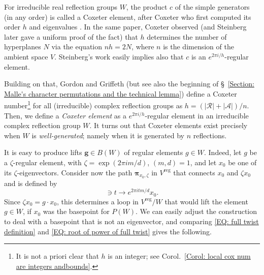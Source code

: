 \documentclass[ALCO, Unicode]{cedram}
\newcommand{\op}[1]{\operatorname{#1}}
\newcommand{\op}[1]{\operatorname{#1}}
\begin{document}
For irreducible real reflection groups $W$, the product $c$ of the simple generators (in any order) is called a Coxeter element, after Coxeter who first computed its order $h$ and eigenvalues \cite{coxeter-duke}. In the same paper, Coxeter observed (and Steinberg later \cite{steinberg-finite-reflection-groups} gave a uniform proof of the fact) that $h$ determines the number of hyperplanes $N$ via the equation $nh=2N$, where $n$ is the dimension of the ambient space $V$. Steinberg's work easily implies also that $c$ is an $e^{2\pi i/h}$-regular element.

Building on that, Gordon and Griffeth (but see also the beginning of \S~\ref{Section: Malle's character permutations and the technical lemma}) define a Coxeter number\footnote{It is not a priori clear that $h$ is an integer; see Corol.~\ref{Corol: local cox num are integers andbounds}.} for all (irreducible) complex reflection groups as $h=(|\mathcal{R}|+|\mathcal{A}|)/n$. Then, we define a {\it \color{blue} Coxeter element} as a $e^{2\pi i/h}$-regular element in an irreducible complex reflection group $W$. It turns out that Coxeter elements exist precisely when $W$ is {\it \color{blue} well-generated}; namely when it is generated by $n$ reflections. 

It is easy to produce lifts $\bm g\in B(W)$ of regular elements $g\in W$. Indeed, let $g$ be a $\zeta$-regular element, with $\zeta=\op{exp}(2\pi i m/d)$, $(m,d)=1$, and let $x_0$ be one of its $\zeta$-eigenvectors. Consider now the path $\bm \pi_{x_0,\zeta}$ in $V^{\op{reg}}$ that connects $x_0$ and $\zeta x_0$ and is defined by \begin{equation}[0,1]\ni t\rightarrow e^{2\pi i tm/d}x_0.\label{EQ: root of power of full twist}\end{equation}
Since $\zeta x_0=g\cdot x_0$, this determines a loop in $V^{\op{reg}}/W$ that would lift the element $g\in W$, if $x_0$ was the basepoint for $P(W)$. We can easily adjust the construction to deal with a basepoint that is not an eigenvector, and comparing \eqref{EQ: full twist definition} and \eqref{EQ: root of power of full twist} gives the following.
\end{document}
